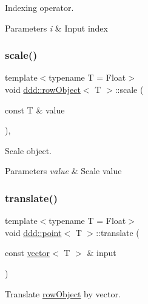 Indexing operator. 


\begin{DoxyParams}{Parameters}
{\em i} & Input index \\
\hline
\end{DoxyParams}
\mbox{\label{classddd_1_1row_object_a6c87f5fadb3b725f6c52cb08aed98eb2}} 
\subsubsection{\texorpdfstring{scale()}{scale()}}
{\footnotesize\ttfamily template$<$typename T  = Float$>$ \\
void \hyperlink{classddd_1_1row_object}{ddd\+::row\+Object}$<$ T $>$\+::scale (\begin{DoxyParamCaption}\item[{const T \&}]{value }\end{DoxyParamCaption})\hspace{0.3cm}{\ttfamily [inline]}, {\ttfamily [inherited]}}



Scale object. 


\begin{DoxyParams}{Parameters}
{\em value} & Scale value \\
\hline
\end{DoxyParams}
\mbox{\label{classddd_1_1point_a36c06fef72376a058c663dd9632ddcd0}} 
\subsubsection{\texorpdfstring{translate()}{translate()}}
{\footnotesize\ttfamily template$<$typename T = Float$>$ \\
void \hyperlink{classddd_1_1point}{ddd\+::point}$<$ T $>$\+::translate (\begin{DoxyParamCaption}\item[{const \hyperlink{classddd_1_1vector}{vector}$<$ T $>$ \&}]{input }\end{DoxyParamCaption})\hspace{0.3cm}{\ttfamily [inline]}}



Translate \hyperlink{classddd_1_1row_object}{row\+Object} by vector. 


